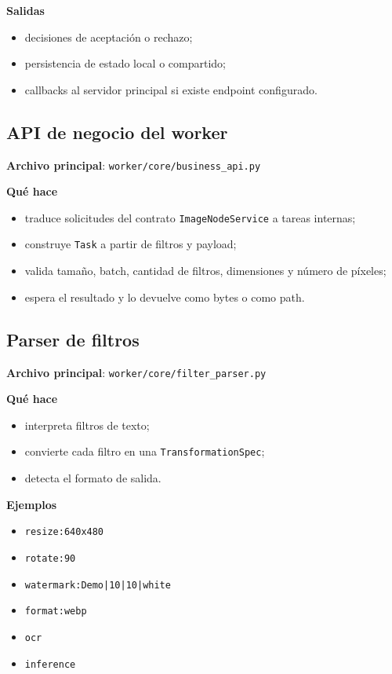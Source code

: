 \documentclass[11pt]{article}
\begin{document}
\textbf{Salidas}
\begin{itemize}
\item decisiones de aceptación o rechazo;
\item persistencia de estado local o compartido;
\item callbacks al servidor principal si existe endpoint configurado.
\end{itemize}

\subsection{API de negocio del worker}
\textbf{Archivo principal}: \texttt{worker/core/business\_api.py}

\textbf{Qué hace}
\begin{itemize}
\item traduce solicitudes del contrato \texttt{ImageNodeService} a tareas internas;
\item construye \texttt{Task} a partir de filtros y payload;
\item valida tamaño, batch, cantidad de filtros, dimensiones y número de píxeles;
\item espera el resultado y lo devuelve como bytes o como path.
\end{itemize}

\subsection{Parser de filtros}
\textbf{Archivo principal}: \texttt{worker/core/filter\_parser.py}

\textbf{Qué hace}
\begin{itemize}
\item interpreta filtros de texto;
\item convierte cada filtro en una \texttt{TransformationSpec};
\item detecta el formato de salida.
\end{itemize}

\textbf{Ejemplos}
\begin{itemize}
\item \texttt{resize:640x480}
\item \texttt{rotate:90}
\item \texttt{watermark:Demo|10|10|white}
\item \texttt{format:webp}
\item \texttt{ocr}
\item \texttt{inference}
\end{itemize}
\end{document}
